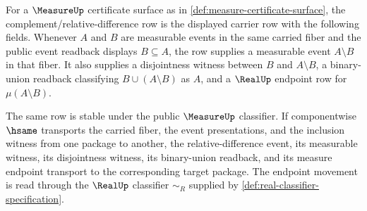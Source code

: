 \begin{definition}
\label{def:measure-complement-difference-row}
For a $\MeasureUp$ certificate surface as in
\autoref{def:measure-certificate-surface}, the complement/relative-difference
row is the displayed carrier row with the following fields. Whenever
$A$ and $B$ are measurable events in the same carried fiber and the public
event readback displays $B\subseteq A$, the row supplies a measurable event
$A\setminus B$ in that fiber. It also supplies a disjointness witness between
$B$ and $A\setminus B$, a binary-union readback classifying
$B\cup(A\setminus B)$ as $A$, and a $\RealUp$ endpoint row for
$\mu(A\setminus B)$.

The same row is stable under the public $\MeasureUp$ classifier. If
componentwise $\hsame$ transports the carried fiber, the event presentations,
and the inclusion witness from one package to another, the relative-difference
event, its measurable witness, its disjointness witness, its binary-union
readback, and its measure endpoint transport to the corresponding target
package. The endpoint movement is read through the $\RealUp$ classifier
$\sim_R$ supplied by \autoref{def:real-classifier-specification}.
\end{definition}
